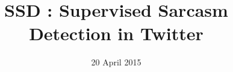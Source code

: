 \documentclass[10pt,conference]{IEEEtran}
\begin{document}
\title{SSD : Supervised Sarcasm Detection in Twitter}

\author{
}


\date{20 April 2015}

\maketitle




%









%
%
%



{\footnotesize}
\end{document}

